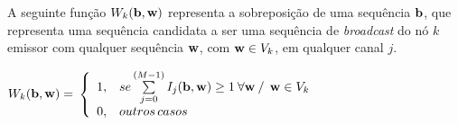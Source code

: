 A seguinte função $W_{k}({\bf b},{\bf w})$ representa a sobreposição de uma sequência ${\bf b}$, que representa uma sequência candidata a ser uma sequência de {\it broadcast} do nó $k$ emissor com qualquer sequência ${\bf w}$, com ${\bf w} \in V_{k}$, em qualquer canal $j$. 







\vspace{0.3cm}

$W_{k}({\bf b},{\bf w}) =$ $\left \{
\begin{array}{l l}
1, & se \sum \limits_{j=0}^{(M-1)}  I_{j}({\bf b},{\bf w}) \geq 1 \: \forall {\bf w} \: / \: \: {\bf w} \in V_{k}\\
0, & outros \, casos
\end{array} \right.$  

\vspace{0.3cm}



